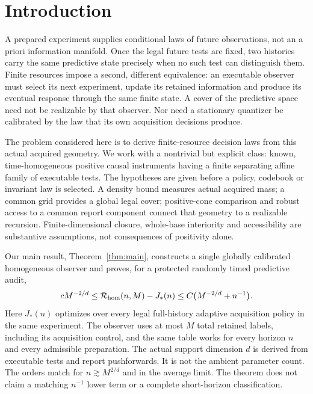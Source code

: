 \section{Introduction}\label{sec:introduction}
A prepared experiment supplies conditional laws of future observations, not an a priori information manifold. Once the legal future tests are fixed, two histories carry the same predictive state precisely when no such test can distinguish them. Finite resources impose a second, different equivalence: an executable observer must select its next experiment, update its retained information and produce its eventual response through the same finite state. A cover of the predictive space need not be realizable by that observer. Nor need a stationary quantizer be calibrated by the law that its own acquisition decisions produce.

The problem considered here is to derive finite-resource decision laws from this actual acquired geometry. We work with a nontrivial but explicit class: known, time-homogeneous positive causal instruments having a finite separating affine family of executable tests. The hypotheses are given before a policy, codebook or invariant law is selected. A density bound measures actual acquired mass; a common grid provides a global legal cover; positive-cone comparison and robust access to a common report component connect that geometry to a realizable recursion. Finite-dimensional closure, whole-base interiority and accessibility are substantive assumptions, not consequences of positivity alone.

Our main result, Theorem~\ref{thm:main}, constructs a single globally calibrated homogeneous observer and proves, for a protected randomly timed predictive audit,
\begin{equation}\label{eq:intro-law}
 cM^{-2/d}\le\mathcal R_{\rm hom}(n,M)-J_*(n)
       \le C\bigl(M^{-2/d}+n^{-1}\bigr).
\end{equation}
Here $J_*(n)$ optimizes over every legal full-history adaptive acquisition policy in the same experiment. The observer uses at most $M$ total retained labels, including its acquisition control, and the same table works for every horizon $n$ and every admissible preparation. The actual support dimension $d$ is derived from executable tests and report pushforwards. It is not the ambient parameter count. The orders match for $n\gtrsim M^{2/d}$ and in the average limit. The theorem does not claim a matching $n^{-1}$ lower term or a complete short-horizon classification.

